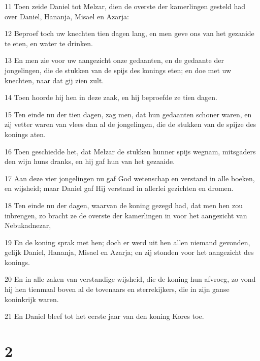 \par 11 Toen zeide Daniel tot Melzar, dien de overste der kamerlingen gesteld had over Daniel, Hananja, Misael en Azarja:
\par 12 Beproef toch uw knechten tien dagen lang, en men geve ons van het gezaaide te eten, en water te drinken.
\par 13 En men zie voor uw aangezicht onze gedaanten, en de gedaante der jongelingen, die de stukken van de spijs des konings eten; en doe met uw knechten, naar dat gij zien zult.
\par 14 Toen hoorde hij hen in deze zaak, en hij beproefde ze tien dagen.
\par 15 Ten einde nu der tien dagen, zag men, dat hun gedaanten schoner waren, en zij vetter waren van vlees dan al de jongelingen, die de stukken van de spijze des konings aten.
\par 16 Toen geschiedde het, dat Melzar de stukken hunner spijs wegnam, mitsgaders den wijn huns dranks, en hij gaf hun van het gezaaide.
\par 17 Aan deze vier jongelingen nu gaf God wetenschap en verstand in alle boeken, en wijsheid; maar Daniel gaf Hij verstand in allerlei gezichten en dromen.
\par 18 Ten einde nu der dagen, waarvan de koning gezegd had, dat men hen zou inbrengen, zo bracht ze de overste der kamerlingen in voor het aangezicht van Nebukadnezar,
\par 19 En de koning sprak met hen; doch er werd uit hen allen niemand gevonden, gelijk Daniel, Hananja, Misael en Azarja; en zij stonden voor het aangezicht des konings.
\par 20 En in alle zaken van verstandige wijsheid, die de koning hun afvroeg, zo vond hij hen tienmaal boven al de tovenaars en sterrekijkers, die in zijn ganse koninkrijk waren.
\par 21 En Daniel bleef tot het eerste jaar van den koning Kores toe.

\chapter{2}

